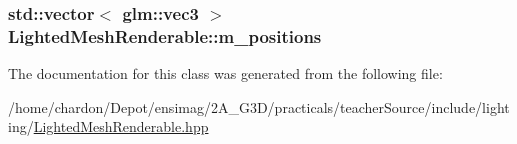 \hypertarget{classLightedMeshRenderable_acc09c83711ed52719dce8ecb21402b73}{
\subsubsection[{m\+\_\+positions}]{\setlength{\rightskip}{0pt plus 5cm}std\+::vector$<$ glm\+::vec3 $>$ Lighted\+Mesh\+Renderable\+::m\+\_\+positions\hspace{0.3cm}{\ttfamily [private]}}}\label{classLightedMeshRenderable_acc09c83711ed52719dce8ecb21402b73}


The documentation for this class was generated from the following file\+:\begin{DoxyCompactItemize}
\item 
/home/chardon/\+Depot/ensimag/2\+A\+\_\+\+G3\+D/practicals/teacher\+Source/include/lighting/\hyperlink{LightedMeshRenderable_8hpp}{Lighted\+Mesh\+Renderable.\+hpp}\end{DoxyCompactItemize}

